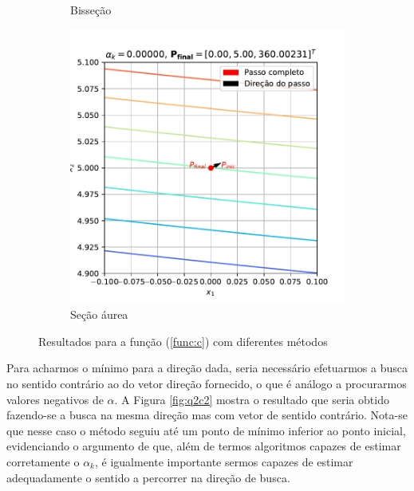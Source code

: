 \documentclass[10pt, a4paper]{article}
\begin{document}
\begin{figure}[htpb]
\begin{subfigure}[b]{0.32\textwidth}
      \caption{Bisseção}
      \label{fig:q2c_2}
  \end{subfigure}
  \hfill
  \begin{subfigure}[b]{0.32\textwidth}
      \centering
      \includegraphics[width=\textwidth]{images/q2c_3.pdf}
      \caption{Seção áurea}
      \label{fig:q2c_3}
  \end{subfigure}
     \caption{Resultados para a função (\ref{func:c}) com diferentes métodos}
     \label{fig:q2c}
\end{figure}

Para acharmos o mínimo para a direção dada, seria necessário efetuarmos a busca no sentido contrário ao do vetor direção fornecido, 
o que é análogo a procurarmos valores negativos de $\alpha$. A Figura \ref{fig:q2c2} mostra o resultado que seria obtido 
fazendo-se a busca na mesma direção mas com vetor de sentido contrário. Nota-se que nesse caso o 
método seguiu até um ponto de mínimo inferior ao ponto inicial, evidenciando o argumento de que, além de termos algoritmos capazes de 
estimar corretamente o $\alpha_k$, é igualmente importante sermos capazes de estimar adequadamente o sentido a percorrer na direção de busca.
\end{document}
